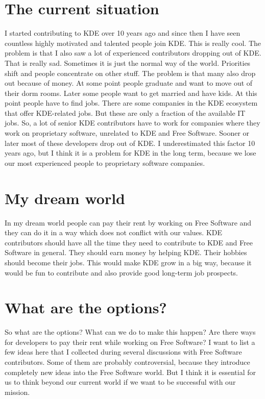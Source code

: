 \section*{The current situation}

I started contributing to KDE over 10 years ago and since then I have seen
countless highly motivated and talented people join KDE. This is really cool.
The problem is that I also saw a lot of experienced contributors dropping out of
KDE. That is really sad. Sometimes it is just the normal way of the world.
Priorities shift and people concentrate on other stuff. The problem is that many
also drop out because of money. At some point people graduate and want to move
out of their dorm rooms. Later some people want to get married and have kids. At
this point people have to find jobs. There are some companies in the KDE
ecosystem that offer KDE-related jobs. But these are only a fraction of the
available IT jobs. So, a lot of senior KDE contributors have to work for
companies where they work on proprietary software, unrelated to KDE and Free
Software. Sooner or later most of these developers drop out of KDE.
I underestimated this factor 10 years ago, but I think it is a problem for KDE
in the long term, because we lose our most experienced people to proprietary
software companies.

\section*{My dream world}

In my dream world people can pay their rent by working on Free Software and
they can do it in a way which does not conflict with our values.
KDE contributors should have all the time they need to contribute to KDE and
Free Software in general. They should earn money by helping KDE. Their hobbies
should become their jobs. This would make KDE grow in a big way, because it
would be fun to contribute and also provide good long-term job prospects.  

\section*{What are the options?}

So what are the options? What can we do to make this happen? Are there ways for
developers to pay their rent while working on Free Software? I want to list a
few ideas here that I collected during several discussions with Free Software
contributors. Some of them are probably controversial, because they introduce
completely new ideas into the Free Software world. But I think it is essential
for us to think beyond our current world if we want to be successful with our
mission.  

